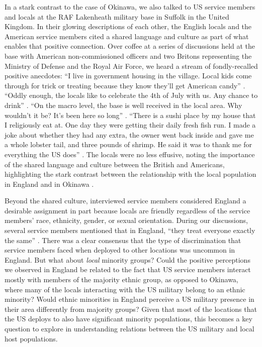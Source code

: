 In a stark contrast to the case of Okinawa, we also talked to US service members and locals at the RAF Lakenheath military base in Suffolk in the United Kingdom. In their glowing descriptions of each other, the English locals and the American service members cited a shared language and culture as part of what enables that positive connection. Over coffee at a series of discussions held at the base with American non-commissioned officers and two Britons representing the Ministry of Defense and the Royal Air Force, we heard a stream of fondly-recalled positive anecdotes: ``I live in government housing in the village. Local kids come through for trick or treating because they know they'll get American candy'' \cite{rafsix20190719}. ``Oddly enough, the locals like to celebrate the 4th of July with us. Any chance to drink'' \cite{rafeight20190719}. ``On the macro level, the base is well received in the local area. Why wouldn’t it be? It's been here so long'' \cite{rafthree20190719}. ``There is a sushi place by my house that I religiously eat at. One day they were getting their daily fresh fish run. I made a joke about whether they had any extra, the owner went back inside and gave me a whole lobster tail, and three pounds of shrimp. He said it was to thank me for everything the US does'' \cite{raffive20190719}. The locals were no less effusive, noting the importance of the shared language and culture between the British and Americans, highlighting the stark contrast between the relationship with the local population in England and in Okinawa \cite{councilone20190718}.

Beyond the shared culture, interviewed service members considered England a desirable assignment in part because locals are friendly regardless of the service members' race, ethnicity, gender, or sexual orientation. During our discussions, several service members mentioned that in England, ``they treat everyone exactly the same'' \cite{raffive20190719}.  There was a clear consensus that the type of discrimination that service members faced when deployed to other locations was uncommon in England. But what about \textit{local} minority groups?  Could the positive perceptions we observed in England be related to the fact that US service members interact mostly with members of the majority ethnic group, as opposed to Okinawa, where many of the locals interacting with the US military belong to an ethnic minority? Would ethnic minorities in England perceive a US military presence in their area differently from majority groups? Given that most of the locations that the US deploys to also have significant minority populations, this becomes a key question to explore in understanding relations between the US military and local host populations. 

